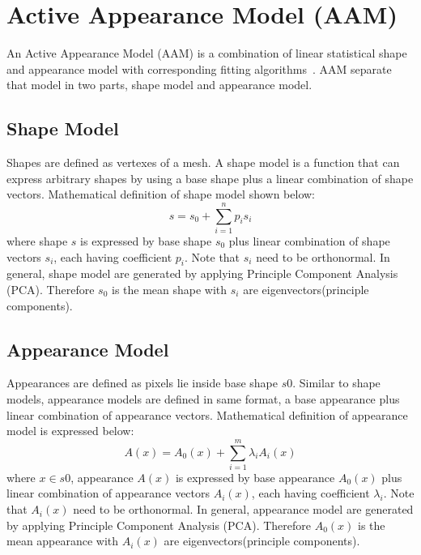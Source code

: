\section{Active Appearance Model (AAM)}
\label{sec:bg_aam}
An Active Appearance Model (AAM) is a combination of linear statistical shape and appearance model with corresponding fitting algorithms~\cite{Matthews2004, Cootes2001}. AAM separate that model in two parts, shape model and appearance model. 

\subsection{Shape Model}
Shapes are defined as vertexes of a mesh. A shape model is a function that can express arbitrary shapes by using a base shape plus a linear combination of shape vectors. Mathematical definition of shape model shown below:
\begin{equation}
s=s_0+\sum^n_{i=1}p_i s_i
\end{equation}
where shape $s$ is expressed by base shape $s_0$ plus linear combination of shape vectors $s_i$, each having coefficient $p_i$. Note that $s_i$ need to be orthonormal. In general, shape model are generated by applying Principle Component Analysis (PCA). Therefore $s_0$ is the mean shape with $s_i$ are eigenvectors(principle components).

\subsection{Appearance Model}
\label{sec:appearance_model}
Appearances are defined as pixels lie inside base shape $s0$. Similar to shape models, appearance models are defined in same format, a base appearance plus linear combination of appearance vectors. Mathematical definition of appearance model is expressed below:
\begin{equation}
A(x)=A_0(x)+\sum^m_{i=1}\lambda_iA_i(x)
\end{equation}
where $x \in s0$, appearance $A(x)$ is expressed by base appearance $A_0(x)$ plus linear combination of appearance vectors $A_i(x)$, each having coefficient $\lambda_i$. Note that $A_i(x)$ need to be orthonormal. In general, appearance model are generated by applying Principle Component Analysis (PCA). Therefore $A_0(x)$ is the mean appearance with $A_i(x)$ are eigenvectors(principle components).


